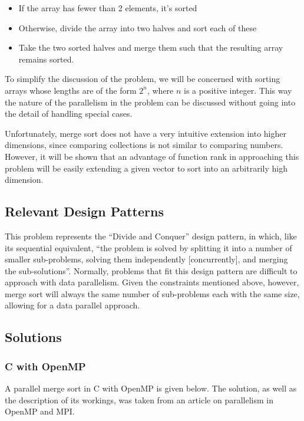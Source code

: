 \begin{itemize}
	\item If the array has fewer than 2 elements, it's sorted
	\item Otherwise, divide the array into two halves and sort each of these
	\item Take the two sorted halves and merge them such that the resulting array remains sorted.
\end{itemize}

To simplify the discussion of the problem, 
we will be concerned with sorting arrays 
whose lengths are of the form $2^n$, where $n$ is a positive integer.
This way the nature of the parallelism in the problem can be discussed 
without going into the detail of handling special cases.

Unfortunately, merge sort does not have a very intuitive extension into higher dimensions, 
since comparing collections is not similar to comparing numbers.
However, it will be shown that an advantage of function rank in approaching this problem
will be easily extending a given vector to sort into an arbitrarily high dimension.

\subsection{Relevant Design Patterns}
This problem represents the ``Divide and Conquer'' design pattern,
in which, like its sequential equivalent,
``the problem is solved by splitting it into a number of smaller sub-problems, 
solving them independently [concurrently], and merging the sub-solutions''\cite{mass}.
Normally, problems that fit this design pattern are difficult to approach with data parallelism.
Given the constraints mentioned above, however,
merge sort will always the same number of sub-problems each with the same size, 
allowing for a data parallel approach.

\subsection{Solutions}
\subsubsection{C with OpenMP}
A parallel merge sort in C with OpenMP is given below.
The solution, as well as the description of its workings, 
was taken from an article on parallelism in OpenMP and MPI\cite{mergeomp}.

\begin{singlespacing}
\begin{small}

\end{small}
\end{singlespacing}

